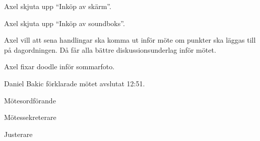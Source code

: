 \documentclass[10pt]{article}
\def\mo{Daniel Bakic}
\def\ms{Axel Voss}
\def\ji{Magnus Lundh}
\begin{document}
\begin{paragrafer}
	\Mbaby 
		
	Axel \ypa skjuta upp ``Inköp av skärm''.
	
	\Mbaby 
	
	Axel \ypa skjuta upp ``Inköp av soundboks''.
	
	\Mbaby
	
		
		
	Axel vill att sena handlingar ska komma ut inför möte om punkter ska läggas till på dagordningen. Då får alla bättre diskussionsunderlag inför mötet. 

	Axel fixar doodle inför sommarfoto.
	
	{\mo} förklarade mötet avslutat 12:51.
\end{paragrafer}

\hidesignfoot
\begin{signatures}{3}
	\signature{\mo}{Mötesordförande}
	\signature{\ms}{Mötessekreterare}
	\signature{\ji}{Justerare}
\end{signatures}
\end{document}
